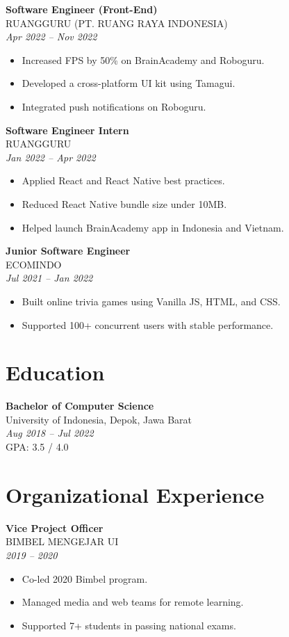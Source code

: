 \documentclass[11pt,a4paper]{article}
\begin{document}
\textbf{Software Engineer (Front-End)} \\
RUANGGURU (PT. RUANG RAYA INDONESIA) \\
\textit{Apr 2022 -- Nov 2022}
\begin{itemize}[leftmargin=*]
    \item Increased FPS by 50\% on BrainAcademy and Roboguru.
    \item Developed a cross-platform UI kit using Tamagui.
    \item Integrated push notifications on Roboguru.
\end{itemize}

\textbf{Software Engineer Intern} \\
RUANGGURU \\
\textit{Jan 2022 -- Apr 2022}
\begin{itemize}[leftmargin=*]
    \item Applied React and React Native best practices.
    \item Reduced React Native bundle size under 10MB.
    \item Helped launch BrainAcademy app in Indonesia and Vietnam.
\end{itemize}

\textbf{Junior Software Engineer} \\
ECOMINDO \\
\textit{Jul 2021 -- Jan 2022}
\begin{itemize}[leftmargin=*]
    \item Built online trivia games using Vanilla JS, HTML, and CSS.
    \item Supported 100+ concurrent users with stable performance.
\end{itemize}

\section*{Education}

\textbf{Bachelor of Computer Science} \\
University of Indonesia, Depok, Jawa Barat \\
\textit{Aug 2018 -- Jul 2022} \\
GPA: 3.5 / 4.0

\section*{Organizational Experience}

\textbf{Vice Project Officer} \\
BIMBEL MENGEJAR UI \\
\textit{2019 -- 2020}
\begin{itemize}[leftmargin=*]
    \item Co-led 2020 Bimbel program.
    \item Managed media and web teams for remote learning.
    \item Supported 7+ students in passing national exams.
\end{itemize}
\end{document}
